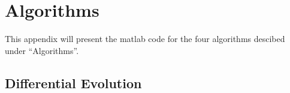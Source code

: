 \section{Algorithms}

This appendix will present the matlab code for the four algorithms descibed under ``Algorithms''.

\subsection{Differential Evolution}

\inputminted{C}{DE.m}
